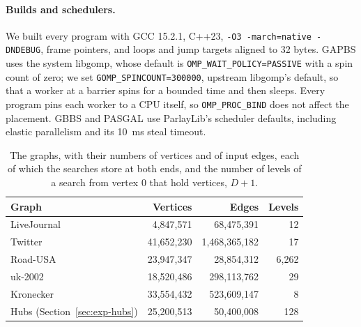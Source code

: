 \paragraph{Builds and schedulers.} We built every program with GCC 15.2.1, C++23, \texttt{-O3 -march=native -DNDEBUG}, frame pointers, and loops and jump targets aligned to 32 bytes. GAPBS uses the system libgomp, whose default is \texttt{OMP\_WAIT\_POLICY=PASSIVE} with a spin count of zero; we set \texttt{GOMP\_SPINCOUNT=300000}, upstream libgomp's default, so that a worker at a barrier spins for a bounded time and then sleeps. Every program pins each worker to a CPU itself, so \texttt{OMP\_PROC\_BIND} does not affect the placement. GBBS and PASGAL use ParlayLib's scheduler defaults, including elastic parallelism and its 10~ms steal timeout.

\begin{table}
    \caption{The graphs, with their numbers of vertices and of input edges, each of which the searches store at both ends, and the number of levels of a search from vertex 0 that hold vertices, $D+1$.}
    \label{tab:graphs}
    \small
    \begin{tabular}{l r r r}
        \toprule
        Graph & Vertices & Edges & Levels \\
        \midrule
        LiveJournal~\cite{livejournal} & 4,847,571 & 68,475,391 & 12 \\
        Twitter~\cite{kwak_twitter} & 41,652,230 & 1,468,365,182 & 17 \\
        Road-USA~\cite{netrepo} & 23,947,347 & 28,854,312 & 6,262 \\
        uk-2002~\cite{boldi_webgraph, davis_suitesparse} & 18,520,486 & 298,113,762 & 29 \\
        Kronecker~\cite{gapbs, graph500} & 33,554,432 & 523,609,147 & 8 \\
        Hubs (Section~\ref{sec:exp-hubs}) & 25,200,513 & 50,400,008 & 128 \\
        \bottomrule
    \end{tabular}
\end{table}

